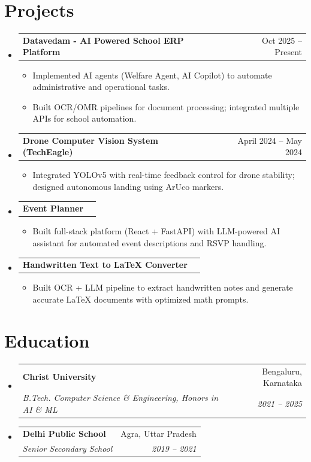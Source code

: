 \documentclass[letterpaper,10pt]{article}
\makeatletter
\newcommand{\resumeItem}[1]{
  \item\small{
    {#1 \vspace{-1pt}}
  }
}
\newcommand{\resumeSubheading}[4]{
  \vspace{-1pt}\item
    \begin{tabular*}{0.97\textwidth}[t]{l@{\extracolsep{\fill}}r}
      \textbf{#1} & #2 \\
      \textit{\small #3} & \textit{\small #4} \\
    \end{tabular*}\vspace{-5pt}
}
\newcommand{\resumeProjectHeading}[2]{
    \item
    \begin{tabular*}{0.97\textwidth}{l@{\extracolsep{\fill}}r}
      \small#1 & #2 \\
    \end{tabular*}\vspace{-1pt}
}
\newcommand{\resumeSubHeadingListStart}{\begin{itemize}[leftmargin=0.15in, label={}]}
\newcommand{\resumeSubHeadingListEnd}{\end{itemize}\vspace{-5pt}}
\newcommand{\resumeItemListStart}{\begin{itemize}\vspace{-3pt}}
\newcommand{\resumeItemListEnd}{\end{itemize}\vspace{-2pt}}
\makeatother
\begin{document}
\section{Projects}
\resumeSubHeadingListStart
    \resumeProjectHeading
      {\textbf{Datavedam - AI Powered School ERP Platform}}{Oct 2025 -- Present}
      \resumeItemListStart
        \resumeItem{Implemented AI agents (Welfare Agent, AI Copilot) to automate administrative and operational tasks.}
        \resumeItem{Built OCR/OMR pipelines for document processing; integrated multiple APIs for school automation.}
      \resumeItemListEnd
    \resumeProjectHeading
      {\textbf{Drone Computer Vision System (TechEagle)}}{April 2024 -- May 2024}
      \resumeItemListStart
        \resumeItem{Integrated YOLOv5 with real-time feedback control for drone stability; designed autonomous landing using ArUco markers.}
      \resumeItemListEnd
    \resumeProjectHeading
      {\textbf{Event Planner}}{}
      \resumeItemListStart
        \resumeItem{Built full-stack platform (React + FastAPI) with LLM-powered AI assistant for automated event descriptions and RSVP handling.}
      \resumeItemListEnd
    \resumeProjectHeading
      {\textbf{Handwritten Text to LaTeX Converter}}{}
      \resumeItemListStart
        \resumeItem{Built OCR + LLM pipeline to extract handwritten notes and generate accurate LaTeX documents with optimized math prompts.}
      \resumeItemListEnd
\resumeSubHeadingListEnd

\section{Education}
\resumeSubHeadingListStart
    \resumeSubheading
      {Christ University}{Bengaluru, Karnataka}
      {B.Tech. Computer Science \& Engineering, Honors in AI \& ML}{2021 -- 2025}
    \resumeSubheading
      {Delhi Public School}{Agra, Uttar Pradesh}
      {Senior Secondary School}{2019 -- 2021}
\resumeSubHeadingListEnd
\end{document}
